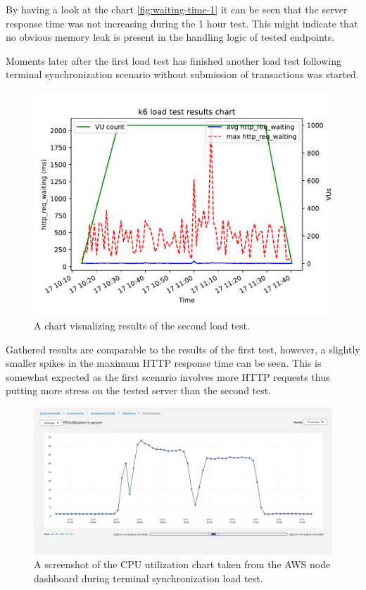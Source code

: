 \documentclass[12pt, a4paper]{article}
\begin{document}
By having a look at the chart \ref{fig:waiting-time-1} it can be seen that the server response time was not increasing during the 1 hour test.
This might indicate that no obvious memory leak is present in the handling logic of tested endpoints.

Moments later after the first load test has finished another load test following terminal synchronization scenario without submission of transactions was started.

\begin{figure}[!ht]
    \centering 
    \includegraphics[width=1\textwidth]{pdf/avg-waiting-time-2.pdf}
    \caption{A chart visualizing results of the second load test.}
    \label{fig:waiting-time-2}
\end{figure}

Gathered results are comparable to the results of the first test, however, a slightly smaller spikes in the maximum HTTP response time can be seen.
This is somewhat expected as the first scenario involves more HTTP requests thus putting more stress on the tested server than the second test.

\begin{figure}[!ht]
    \centering 
    \includegraphics[width=1\textwidth]{img/node-cpu-usage.png}
    \caption{A screenshot of the CPU utilization chart taken from the AWS node dashboard during terminal synchronization load test.}
    \label{fig:cpu-usage-1}
\end{figure}
\end{document}

